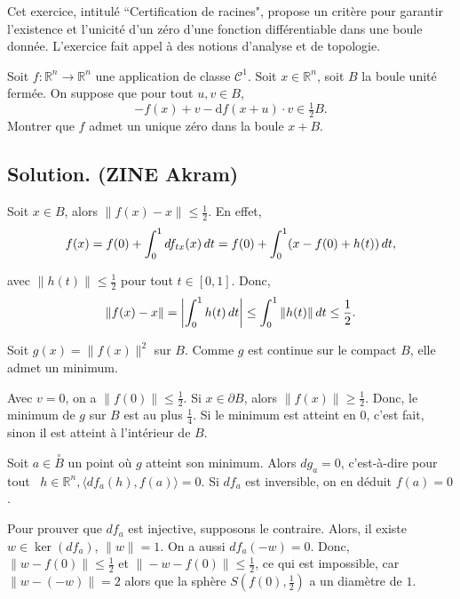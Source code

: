 Cet exercice, intitul{\'e} ``Certification de racines", propose un crit{\`e}re
pour garantir l'existence et l'unicit{\'e} d'un z{\'e}ro d'une fonction
diff{\'e}rentiable dans une boule donn{\'e}e. L'exercice fait appel {\`a} des
notions d'analyse et de topologie.
\begin{exercise}
Soit $f : \mathbb{R}^n \to \mathbb{R}^n$ une application de classe
$\mathcal{C}^1$. Soit $x \in \mathbb{R}^n$, soit $B$ la boule unit{\'e}
ferm{\'e}e. On suppose que pour tout $u, v \in B$,
\[ - f (x) + v - \mathrm{d} f (x + u) \cdot v \in \tfrac{1}{2} B. \]
Montrer que $f$ admet un unique z{\'e}ro dans la boule $x + B$.

\end{exercise}

\subsection*{Solution. (ZINE Akram)}


Soit $x \in B$, alors $\|f (x) - x\| \leq \frac{1}{2}$. En effet,
\[ f (x) = f (0) + \int_0^1 df_{tx} (x) \hspace{0.17em} dt = f (0) + \int_0^1
   (x - f (0) + h (t))  \hspace{0.17em} dt, \]


avec $\|h (t)\| \leq \frac{1}{2}$ pour tout $t \in [0, 1]$. Donc,
\[ \|f (x) - x\|= \left| \int_0^1 h (t) \hspace{0.17em} dt \right| \leq
   \int_0^1 \|h (t)\| \hspace{0.17em} dt \leq \frac{1}{2} . \]


Soit $g (x) =\|f (x)\|^2$ sur $B$. Comme $g$ est continue sur le compact $B$,
elle admet un minimum.

Avec $v = 0$, on a $\|f (0)\| \leq \frac{1}{2}$. Si $x \in \partial B$, alors
$\|f (x)\| \geq \frac{1}{2}$. Donc, le minimum de $g$ sur $B$ est au plus
$\frac{1}{4}$. Si le minimum est atteint en $0$, c'est fait, sinon il est
atteint {\`a} l'int{\'e}rieur de $B$.

Soit $a \in \overset{\circ}{B}$ un point o{\`u} $g$ atteint son minimum. Alors
$dg_a = 0$, c'est-{\`a}-dire pour tout \ $h \in \mathbb{R}^n, \langle df_a
(h), f (a) \rangle = 0$. Si $df_a$ est inversible, on en d{\'e}duit $f (a) =
0$.

Pour prouver que $df_a$ est injective, supposons le contraire. Alors, il
existe $w \in \ker (df_a)$, $\|w\|= 1$. On a aussi $df_a (- w) = 0$. Donc,
$\|w - f (0)\| \leq \frac{1}{2}$ et $\|- w - f (0)\| \leq \frac{1}{2}$, ce qui
est impossible, car $\|w - (- w)\|= 2$ alors que la sph{\`e}re $S (f (0),
\frac{1}{2})$ a un diam{\`e}tre de $1$.

